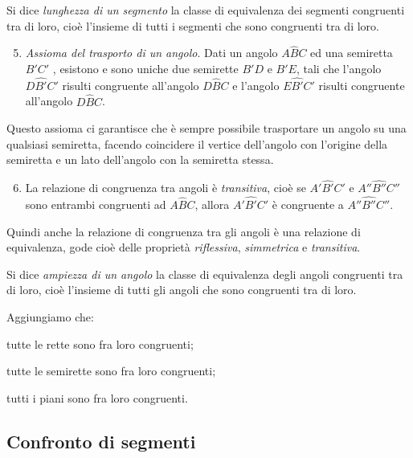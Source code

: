 \begin{definizione}
Si dice \emph{lunghezza di un segmento} la classe di equivalenza dei segmenti congruenti tra di loro, cioè l'insieme di tutti i segmenti che sono congruenti tra di loro.
\end{definizione}

\begin{enumerate}[label=\Roman{*}.]
\setcounter{enumi}{4}
\item \emph{Assioma del trasporto di un angolo}. Dati un angolo $A\widehat{B}C$ ed una semiretta $B'C'$ , esistono e sono uniche due semirette $B'D$ e $B'E$, tali che l'angolo $D\widehat{B'}C'$ risulti congruente all'angolo $D\widehat{B}C$ e l'angolo $E\widehat{B'}C'$ risulti congruente all'angolo $D\widehat{B}C$.
\end{enumerate}
Questo assioma ci garantisce che è sempre possibile trasportare un angolo su una qualsiasi semiretta, facendo coincidere il vertice dell'angolo con l'origine della semiretta e un lato dell'angolo con la semiretta stessa.

\begin{enumerate}[label=\Roman{*}.]
\setcounter{enumi}{5}
\item La relazione di congruenza tra angoli è \emph{transitiva}, cioè se $A'\widehat{B'}C'$ e $A''\widehat{B''}C''$ sono entrambi congruenti ad $A\widehat{B}C$, allora $A'\widehat{B'}C'$ è congruente a $A''\widehat{B''}C''$.
\end{enumerate}

Quindi anche la relazione di congruenza tra gli angoli è una relazione di equivalenza, gode cioè delle proprietà \emph{riflessiva}, \emph{simmetrica} e \emph{transitiva}.

\begin{definizione}
Si dice \emph{ampiezza di un angolo} la classe di equivalenza degli angoli congruenti tra di loro, cioè l'insieme di tutti gli angoli che sono congruenti tra di loro.
\end{definizione}

Aggiungiamo che:
\begin{itemize*}
\item tutte le rette sono fra loro congruenti;
\item tutte le semirette sono fra loro congruenti;
\item tutti i piani sono fra loro congruenti.
\end{itemize*}

\subsection{Confronto di segmenti}

